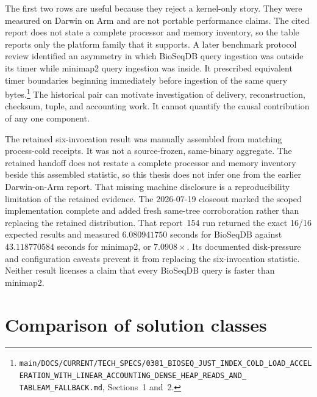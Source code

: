 The first two rows are useful because they reject a kernel-only story.
They were measured on Darwin on Arm and are not portable performance claims.
The cited report does not state a complete processor and memory inventory, so
the table reports only the platform family that it supports.
A later benchmark protocol review identified an asymmetry in which BioSeqDB
query ingestion was outside its timer while minimap2 query ingestion was
inside.  It prescribed equivalent timer boundaries beginning immediately
before ingestion of the same query bytes.\footnote{
\texttt{main/DOCS/CURRENT/TECH\_SPECS/}\linebreak[4]%
\texttt{0381\_BIOSEQ\_JUST\_INDEX\_COLD\_LOAD\_}\linebreak[4]%
\texttt{ACCELERATION\_WITH\_LINEAR\_ACCOUNTING\_}\linebreak[4]%
\texttt{DENSE\_HEAP\_READS\_AND\_}\allowbreak%
\texttt{TABLEAM\_FALLBACK.md},
Sections~1 and~2.}  The historical pair can motivate investigation of
delivery, reconstruction, checksum, tuple, and accounting work.  It cannot
quantify the causal contribution of any one component.

The retained six-invocation result was manually assembled from matching
process-cold receipts.  It was not a source-frozen, same-binary aggregate.
The retained handoff does not restate a complete processor and memory
inventory beside this assembled statistic, so this thesis does not infer one
from the earlier Darwin-on-Arm report.  That missing machine disclosure is a
reproducibility limitation of the retained evidence.
The 2026-07-19 closeout marked the scoped implementation complete and added
fresh same-tree corroboration rather than replacing the retained
distribution.  That report~154 run returned the exact 16/16 expected results
and measured \(6.080941750\) seconds for BioSeqDB against
\(43.118770584\) seconds for minimap2, or \(7.0908\times\).  Its documented
disk-pressure and configuration caveats prevent it from replacing the
six-invocation statistic.  Neither result licenses a claim that every
BioSeqDB query is faster than minimap2.

\section{Comparison of solution classes}
\label{sec:solution-class-comparison}

